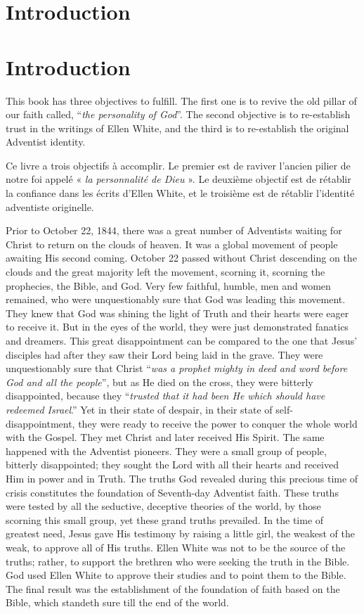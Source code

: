 \chapter*{Introduction}


\chapter*{Introduction}


This book has three objectives to fulfill. The first one is to revive the old pillar of our faith called, “\textit{the personality of God}”. The second objective is to re-establish trust in the writings of Ellen White, and the third is to re-establish the original Adventist identity.


Ce livre a trois objectifs à accomplir. Le premier est de raviver l'ancien pilier de notre foi appelé « \textit{la personnalité de Dieu} ». Le deuxième objectif est de rétablir la confiance dans les écrits d'Ellen White, et le troisième est de rétablir l'identité adventiste originelle.


Prior to October 22, 1844, there was a great number of Adventists waiting for Christ to return on the clouds of heaven. It was a global movement of people awaiting His second coming. October 22 passed without Christ descending on the clouds and the great majority left the movement, scorning it, scorning the prophecies, the Bible, and God. Very few faithful, humble, men and women remained, who were unquestionably sure that God was leading this movement. They knew that God was shining the light of Truth and their hearts were eager to receive it. But in the eyes of the world, they were just demonstrated fanatics and dreamers. This great disappointment can be compared to the one that Jesus’ disciples had after they saw their Lord being laid in the grave. They were unquestionably sure that Christ “\textit{was a prophet mighty in deed and word before God and all the people}”, but as He died on the cross, they were bitterly disappointed, because they “\textit{trusted that it had been He which should have redeemed Israel}.” Yet in their state of despair, in their state of self-disappointment, they were ready to receive the power to conquer the whole world with the Gospel. They met Christ and later received His Spirit. The same happened with the Adventist pioneers. They were a small group of people, bitterly disappointed; they sought the Lord with all their hearts and received Him in power and in Truth. The truths God revealed during this precious time of crisis constitutes the foundation of Seventh-day Adventist faith. These truths were tested by all the seductive, deceptive theories of the world, by those scorning this small group, yet these grand truths prevailed. In the time of greatest need, Jesus gave His testimony by raising a little girl, the weakest of the weak, to approve all of His truths. Ellen White was not to be the source of the truths; rather, to support the brethren who were seeking the truth in the Bible. God used Ellen White to approve their studies and to point them to the Bible. The final result was the establishment of the foundation of faith based on the Bible, which standeth sure till the end of the world.


